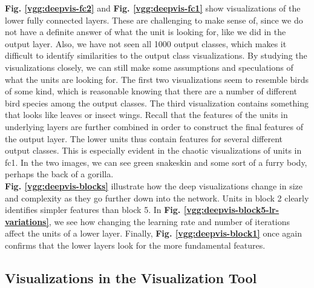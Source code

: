 \noindent \textbf{Fig. \ref{vgg:deepvis-fc2}} and \textbf{Fig. \ref{vgg:deepvis-fc1}} show visualizations of the lower fully connected layers. These are challenging to make sense of, since we do not have a definite answer of what the unit is looking for, like we did in the output layer. Also, we have not seen all 1000 output classes, which makes it difficult to identify similarities to the output class visualizations. By studying the visualizations closely, we can still make some assumptions and speculations of what the units are looking for. The first two visualizations seem to resemble birds of some kind, which is reasonable knowing that there are a number of different bird species among the output classes. The third visualization contains something that looks like leaves or insect wings. Recall that the features of the units in underlying layers are further combined in order to construct the final features of the output layer. The lower units thus contain features for several different output classes. This is especially evident in the chaotic visualizations of units in fc1. In the two images, we can see green snakeskin and some sort of a furry body, perhaps the back of a gorilla. \\ %

\noindent \textbf{Fig. \ref{vgg:deepvis-blocks}} illustrate how the deep visualizations change in size and complexity as they go further down into the network. Units in block 2 clearly identifies simpler features than block 5. In \textbf{Fig. \ref{vgg:deepvis-block5-lr-variations}}, we see how changing the learning rate and number of iterations affect the units of a lower layer. %
Finally, \textbf{Fig. \ref{vgg:deepvis-block1}} once again confirms that the lower layers look for the more fundamental features. %

\subsection{Visualizations in the Visualization Tool}

